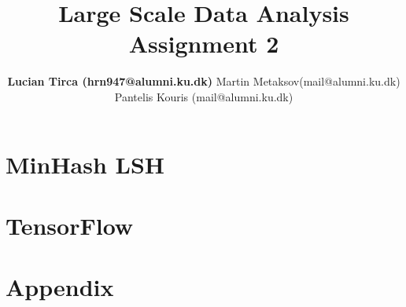 \documentclass{article}
\begin{document}
\title{\textbf{Large Scale Data Analysis Assignment 2}}
\author{\textbf{Lucian Tirca (hrn947@alumni.ku.dk)} Martin Metaksov(mail@alumni.ku.dk) Pantelis Kouris (mail@alumni.ku.dk)}
\maketitle


\section{MinHash LSH}



\section{TensorFlow} 



\section*{Appendix} 


\printbibliography
\end{document}
